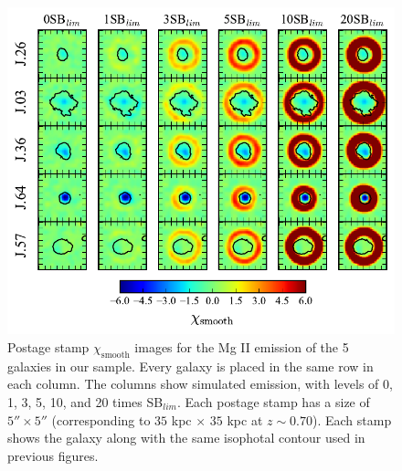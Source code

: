 \documentclass[twocolumn]{aastex61}
\begin{document}
\begin{figure}[p]
\centering
\includegraphics[scale=1.2]{../Figures/sigmas.pdf}
\caption{Postage stamp $\chi_{\text{smooth}}$ images for the Mg II emission of the 5 galaxies in our sample. Every galaxy is placed in the same row in each column. The columns show simulated emission, with levels of 0, 1, 3, 5, 10, and 20 times SB$_{lim}$.  Each postage stamp has a size of $5'' \times 5''$ (corresponding to $35$ kpc $\times$ $35$ kpc at $z\sim 0.70$). Each stamp shows the galaxy along with the same isophotal contour used in previous figures.}
\label{fig:sigmas}
\end{figure}
\end{document}
